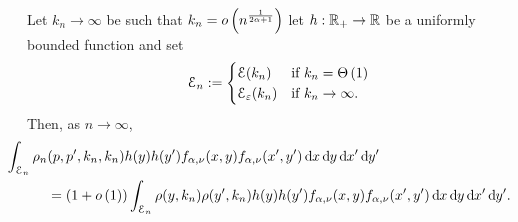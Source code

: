 \begin{lemma}\label{lem:joint_degree_factorization}
Let $k_n \to \infty$ be such that $k_n = o\left(n^{\frac{1}{2\alpha + 1}}\right)$ let $h : {\mathbb R}_+ \to {\ensuremath{\mathbb R}}$ be a uniformly bounded function and set
\[
	\mathcal{E}_n := \begin{cases}
		\mathcal{E}(k_n) &\mbox{if } k_n = \Theta\left(1\right)\\
		\mathcal{E}_\varepsilon(k_n) &\mbox{if } k_n \to \infty.
	\end{cases}
\]
Then, as $n \to \infty$,
\begin{align*}
	&\hspace{-30pt}\int_{\mathcal{E}_n} \rho_{n}(p,p^\prime,k_n,k_n) h(y)h(y^\prime) 
		f_{\alpha,\nu}(x,y)	f_{\alpha,\nu}(x^\prime,y^\prime) \dd x \dd y \dd x^\prime \dd y^\prime\\
	&= (1+\smallO{1})\int_{\mathcal{E}_n} \rho(y,k_n)\rho(y^\prime,k_n) h(y)h(y^\prime) 
		f_{\alpha,\nu}(x,y)	f_{\alpha,\nu}(x^\prime,y^\prime) \dd x \dd y \dd x^\prime \dd y^\prime.
\end{align*}
\end{lemma}

